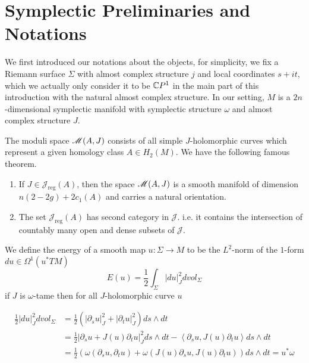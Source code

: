 \documentclass[twoside]{article}
\begin{document}
\section{Symplectic Preliminaries and Notations}

We first introduced our notations about the objects, 
for simplicity, we fix a Riemann surface $\Sigma$ with almost complex structure $j$ 
and local coordinates $s+it$, which we actually only consider it to be $\mathbb{C}P^{1}$ 
in the main part of this introduction with the natural almost complex structure. 
In our setting, $M$ is a $2n$-dimensional symplectic manifold 
with symplectic structure $\omega$ and almost complex structure $J$. 

The moduli space $\mathscr{M}(A,J)$ consists of all simple $J$-holomorphic curves 
which represent a given homology class $A\in H_2(M)$. We have the following famous theorem.

\begin{theorem}
    \begin{enumerate}
        \item If $J\in \mathscr{J}_{\textrm{reg}}(A)$, 
        then the space $\mathscr{M}(A,J)$ is a smooth manifold of dimension $n(2-2g)+2c_1(A)$ and carries a natural orientation.
        \item The set $\mathscr{J}_{\textrm{reg}}(A)$ has second category in $\mathscr{J}$. 
        i.e. it contains the intersection of countably many open and dense subsets of $\mathscr{J}$.
    \end{enumerate}
\end{theorem}

We define the energy of a smooth map $u\colon \Sigma\rightarrow M$ 
to be the $L^2$-norm of the $1$-form $du\in \Omega^1(u^*TM)$
\[E(u)=\frac{1}{2}\int_{\Sigma}|du|^2_Jdvol_\Sigma\]
if $J$ is $\omega$-tame then for all $J$-holomorphic curve $u$

\begin{displaymath}
\begin{split}
\frac{1}{2}|du|^2_Jdvol_\Sigma&=\frac{1}{2}\left(|\partial_su|_J^2+|\partial_tu|_J^2\right)ds\wedge dt \\
&=\frac{1}{2}|\partial_su+J(u)\partial_tu|_J^2ds\wedge dt-\left\langle \partial_su,J(u)\partial_tu \right\rangle ds\wedge dt \\
&=\frac{1}{2}\left(\omega(\partial_su,\partial_tu)+\omega(J(u)\partial_su,J(u)\partial_tu) \right)ds\wedge dt=u^*\omega
\end{split}
\end{displaymath}
\end{document}
